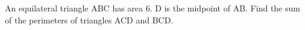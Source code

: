 An equilateral triangle ABC has area 6. D is the midpoint of AB. Find the sum of the perimeters of triangles ACD and BCD.
